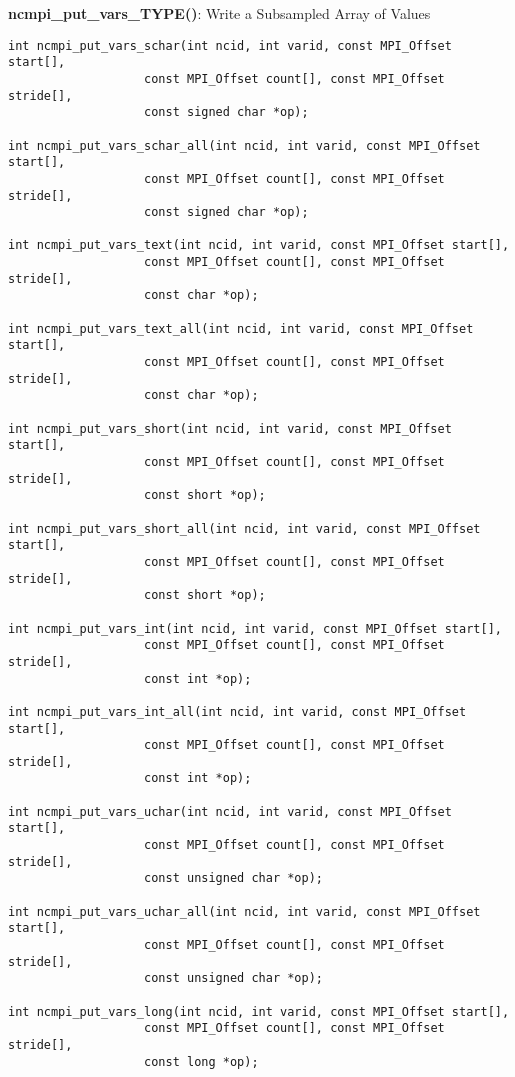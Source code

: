 {\bf ncmpi\_put\_vars\_TYPE()}: Write a Subsampled Array of Values

\begin{verbatim}
int ncmpi_put_vars_schar(int ncid, int varid, const MPI_Offset start[],
                   const MPI_Offset count[], const MPI_Offset stride[],
                   const signed char *op); 

int ncmpi_put_vars_schar_all(int ncid, int varid, const MPI_Offset start[],
                   const MPI_Offset count[], const MPI_Offset stride[],
                   const signed char *op); 

int ncmpi_put_vars_text(int ncid, int varid, const MPI_Offset start[],
                   const MPI_Offset count[], const MPI_Offset stride[],
                   const char *op); 

int ncmpi_put_vars_text_all(int ncid, int varid, const MPI_Offset start[],
                   const MPI_Offset count[], const MPI_Offset stride[],
                   const char *op); 

int ncmpi_put_vars_short(int ncid, int varid, const MPI_Offset start[],
                   const MPI_Offset count[], const MPI_Offset stride[],
                   const short *op); 

int ncmpi_put_vars_short_all(int ncid, int varid, const MPI_Offset start[],
                   const MPI_Offset count[], const MPI_Offset stride[],
                   const short *op); 

int ncmpi_put_vars_int(int ncid, int varid, const MPI_Offset start[],
                   const MPI_Offset count[], const MPI_Offset stride[],
                   const int *op); 

int ncmpi_put_vars_int_all(int ncid, int varid, const MPI_Offset start[],
                   const MPI_Offset count[], const MPI_Offset stride[],
                   const int *op); 

int ncmpi_put_vars_uchar(int ncid, int varid, const MPI_Offset start[],
                   const MPI_Offset count[], const MPI_Offset stride[],
                   const unsigned char *op);

int ncmpi_put_vars_uchar_all(int ncid, int varid, const MPI_Offset start[],
                   const MPI_Offset count[], const MPI_Offset stride[],
                   const unsigned char *op); 

int ncmpi_put_vars_long(int ncid, int varid, const MPI_Offset start[],
                   const MPI_Offset count[], const MPI_Offset stride[],
                   const long *op);


\end{verbatim}
